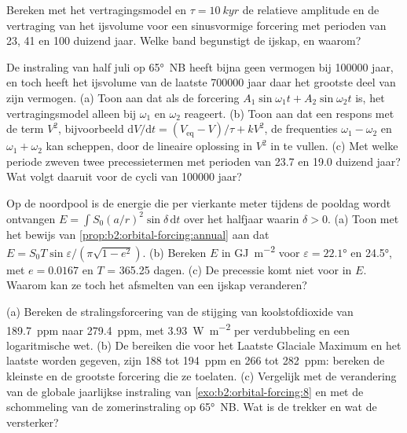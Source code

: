 \begin{exercise}[$\star\star$]\label{exo:b2:orbital-forcing:9}
Bereken met het vertragingsmodel en $\tau = \qty{10}{kyr}$ de relatieve amplitude en de vertraging van het
ijsvolume voor een sinusvormige forcering met perioden van 23, 41 en \num{100} duizend jaar. Welke band
begunstigt de ijskap, en waarom?
\end{exercise}

\begin{exercise}[$\star\star\star$]\label{exo:b2:orbital-forcing:10}
De instraling van half juli op \ang{65}~NB heeft bijna geen vermogen bij \num{100000} jaar, en toch heeft het ijsvolume
van de laatste \num{700000} jaar daar het grootste deel van zijn vermogen. (a) Toon aan dat als de forcering $A_1\sin
\omega_1 t + A_2\sin\omega_2 t$ is, het vertragingsmodel alleen bij $\omega_1$ en $\omega_2$ reageert. (b) Toon aan
dat een respons met de term $V^2$, bijvoorbeeld $\mathrm dV/\mathrm dt = (V_{\mathrm{eq}} -
V)/\tau + kV^2$, de frequenties $\omega_1 - \omega_2$ en $\omega_1 + \omega_2$ kan scheppen, door
de lineaire oplossing in $V^2$ in te vullen. (c) Met welke periode zweven twee precessietermen met perioden van \num{23.7} en
\num{19.0} duizend jaar? Wat volgt daaruit voor de cycli van \num{100000}
jaar?
\end{exercise}

\begin{exercise}[$\star\star\star$]\label{exo:b2:orbital-forcing:11}
Op de noordpool is de energie die per vierkante meter tijdens de pooldag wordt ontvangen $E = \int S_0(a/r)^2
\sin\delta\,\mathrm dt$ over het halfjaar waarin $\delta > 0$. (a) Toon met het bewijs van
\cref{prop:b2:orbital-forcing:annual} aan dat $E = S_0T\sin\varepsilon/(\pi\sqrt{1 - e^2})$. (b) Bereken
$E$ in \unit{GJ.m^{-2}} voor $\varepsilon = \ang{22.1}$ en \ang{24.5}, met $e = 0.0167$ en $T$ =
365.25 dagen. (c) De precessie komt niet voor in $E$. Waarom kan ze toch het
afsmelten van een ijskap veranderen?
\end{exercise}

\begin{exercise}[$\star\star\star$]\label{exo:b2:orbital-forcing:12}
(a) Bereken de stralingsforcering van de stijging van koolstofdioxide van \qty{189.7}{ppm} naar
\qty{279.4}{ppm}, met \qty{3.93}{W.m^{-2}} per verdubbeling en een logaritmische wet. (b) De bereiken
die voor het Laatste Glaciale Maximum en het laatste  worden gegeven, zijn 188 tot \qty{194}{ppm} en 266 tot
\qty{282}{ppm}: bereken de kleinste en de grootste forcering die ze toelaten. (c) Vergelijk met de verandering
van de globale jaarlijkse instraling van \cref{exo:b2:orbital-forcing:8} en met de schommeling van de
zomerinstraling op \ang{65}~NB. Wat is de trekker en wat de versterker?
\end{exercise}

